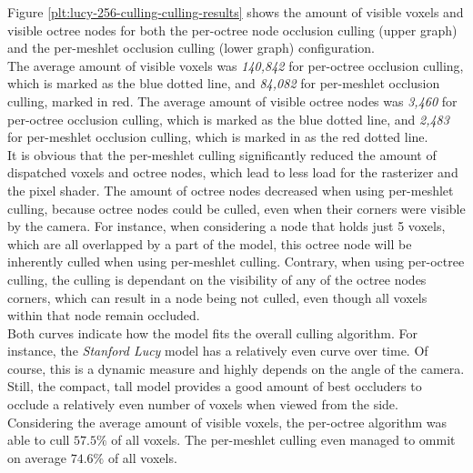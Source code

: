 
\noindent
Figure \ref{plt:lucy-256-culling-culling-results} shows the amount of visible voxels and visible octree 
nodes for both the per-octree node occlusion culling (upper graph) and the per-meshlet occlusion culling 
(lower graph) configuration. \\

\noindent
The average amount of visible voxels was \emph{140,842} for per-octree occlusion culling, which is marked 
as the blue dotted line, and \emph{84,082} for per-meshlet occlusion culling, marked in red.
The average amount of visible octree nodes was \emph{3,460} for per-octree occlusion culling, which is marked 
as the blue dotted line, and \emph{2,483} for per-meshlet occlusion culling, which is marked in as the red 
dotted line. \\

It is obvious that the per-meshlet culling significantly reduced the amount of dispatched voxels and octree nodes, 
which lead to less load for the rasterizer and the pixel shader. The amount of octree nodes decreased when using 
per-meshlet culling, because octree nodes could be culled, even when their corners were visible by the camera. 
For instance, when considering a node that holds just 5 voxels, which are all overlapped by a part of the model, 
this octree node will be inherently culled when using per-meshlet culling. Contrary, when using per-octree culling, 
the culling is dependant on the visibility of any of the octree nodes corners, which can result in a node being not 
culled, even though all voxels within that node remain occluded. \\

\noindent 
Both curves indicate how the model fits the overall culling algorithm. For instance, the \emph{Stanford Lucy} 
model has a relatively even curve over time. Of course, this is a dynamic measure and highly depends on the 
angle of the camera. Still, the compact, tall model provides a good amount of best occluders to occlude a 
relatively even number of voxels when viewed from the side. \\

\noindent
Considering the average amount of visible voxels, the per-octree algorithm was able to cull $57.5\%$ of all 
voxels. The per-meshlet culling even managed to ommit on average $74.6\%$ of all voxels. 


